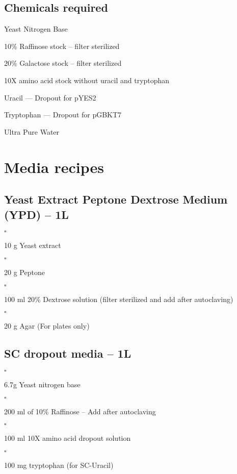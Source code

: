\documentclass[a4paper,12pt]{article}
\newenvironment{packed_enum}{
\begin{enumerate}
  \setlength{\itemsep}{1pt}
  \setlength{\parskip}{0pt}
  \setlength{\parsep}{0pt}
}{\end{enumerate}}
\newcommand{\checkbox}{$\square$\hspace{1mm}}
\newcommand{\icb}{\item \checkbox}
\begin{document}
		\subsection{Chemicals required}
			\begin{packed_enum}
			\item Yeast Nitrogen Base
			\item 10\% Raffinose stock -- filter sterilized
			\item 20\% Galactose stock -- filter sterilized
			\item 10X amino acid stock without uracil and tryptophan
			\item Uracil --- Dropout for pYES2
			\item Tryptophan --- Dropout for pGBKT7
			\item Ultra Pure Water
			\end{packed_enum}
\section{Media recipes}
	\subsection{Yeast Extract Peptone Dextrose Medium (YPD) -- 1L}
	\begin{packed_enum}
	 	{\icb} 10 g Yeast extract
		{\icb} 20 g Peptone 
		{\icb} 100 ml 20\% Dextrose solution (filter sterilized and add after autoclaving)
		{\icb} 20 g Agar (For plates only)
	\end{packed_enum}
	
	\subsection{SC dropout media -- 1L}
	\begin{packed_enum}
	 	{\icb} 6.7g Yeast nitrogen base
		{\icb} 200 ml of 10\% Raffinose -- Add after autoclaving
		{\icb} 100 ml 10X amino acid dropout solution
		{\icb} 100 mg tryptophan (for SC-Uracil)
	\end{packed_enum}
\end{document}
